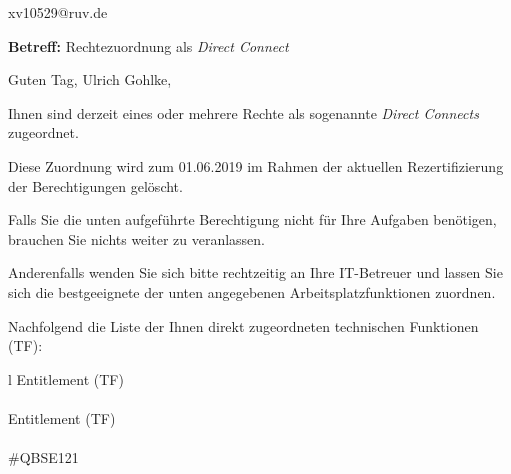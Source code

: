 \documentclass[a4paper,landscape,12pt]{letter}
\begin{document}
\begin{letter}{xv10529@ruv.de\hfill \break}
\begin{normalsize}
	\opening{\textbf{Betreff:} Rechtezuordnung als \emph{Direct Connect}}
	\begin{normalsize} \hfill
	\end{normalsize}

	\begin{normalsize}
		Guten Tag, 
	Ulrich Gohlke, \hfill \break
	\end{normalsize}
	\end{normalsize}
	
\begin{normalsize}
	Ihnen sind derzeit eines oder mehrere Rechte als sogenannte \emph{Direct Connects} zugeordnet.
	
	Diese Zuordnung wird zum 01.06.2019 im Rahmen der aktuellen Rezertifizierung der Berechtigungen gelöscht.
	
	Falls Sie die unten aufgeführte Berechtigung nicht für Ihre Aufgaben benötigen, 
	brauchen Sie nichts weiter zu veranlassen.
	
	Anderenfalls wenden Sie sich bitte rechtzeitig an Ihre IT-Betreuer 
	und lassen Sie sich die bestgeeignete der unten angegebenen Arbeitsplatzfunktionen zuordnen.
	\end{normalsize}
	
\begin{normalsize}
	Nachfolgend die Liste der Ihnen direkt zugeordneten technischen Funktionen (TF):

	\begin{longtable}{l}
		Entitlement (TF) \\ \hline
		\endfirsthead
		\\\hline
		Entitlement (TF) \\ \hline
		\endhead %
		\multicolumn{1}{r@{}}{Fortsetzung \ldots}\\
		\endfoot
		\hline
		\endlastfoot
	\#QBSE121\\
	\end{longtable}
	\end{normalsize}
	

\end{letter}
\end{document}
